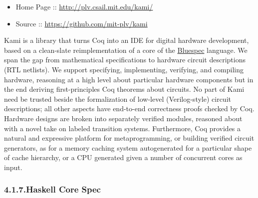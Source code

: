 \documentclass[12pt,twoside]{article}
\begin{document}
\begin{itemize}[noitemsep,topsep=\mdcompacttopsep]%

\item{}Home Page :: \href{http://plv.csail.mit.edu/kami/}{{\ttfamily http://\hspace{0pt}plv.\hspace{0pt}csail.\hspace{0pt}mit.\hspace{0pt}edu/\hspace{0pt}kami/\hspace{0pt}}}%

\item{}Source :: \href{https://github.com/mit-plv/kami}{{\ttfamily https://\hspace{0pt}github.\hspace{0pt}com/\hspace{0pt}mit-\hspace{0pt}plv/\hspace{0pt}kami}}%
\end{itemize}%

\noindent{}Kami is a library that turns Coq into an IDE for digital hardware
development, based on a clean-slate reimplementation of a core of the
\href{http://www.bluespec.com}{Bluespec} language. We span the gap from mathematical specifications to
hardware circuit descriptions (RTL netlists). We support specifying,
implementing, verifying, and compiling hardware, reasoning at a high
level about particular hardware components but in the end deriving
first-principles Coq theorems about circuits. No part of Kami need be
trusted beside the formalization of low-level (Verilog-style) circuit
descriptions; all other aspects have end-to-end correctness proofs
checked by Coq. Hardware designs are broken into separately verified
modules, reasoned about with a novel take on labeled transition
systems. Furthermore, Coq provides a natural and expressive platform
for metaprogramming, or building verified circuit generators, as for a
memory caching system autogenerated for a particular shape of cache
hierarchy, or a CPU generated given a number of concurrent cores as
input.%

\subsubsection{4.1.7.\hspace*{0.5em}Haskell Core Spec}\label{sec-haskell-core-spec}%
\end{document}
